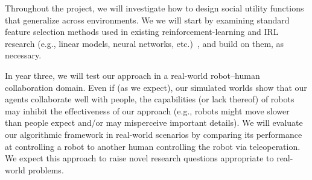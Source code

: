 
\commenta{!!!}
Throughout the project, we will investigate how to design social
utility functions that generalize across environments. We we will
start by examining standard feature selection methods used in existing
reinforcement-learning and IRL research (e.g., linear models, neural
networks,
etc.)~\cite{diuk2009adaptive,kolter2009regularization,li2009reinforcement,parr2008analysis},
and build on them, as necessary.

In year three, we will test our approach in a real-world robot--human
collaboration domain.  Even if (as we expect), our simulated worlds
show that our agents collaborate well with people, the capabilities
(or lack thereof) of robots may inhibit the effectiveness of our
approach (e.g., robots might move slower than people expect and/or may
misperceive important details).  We will evaluate our algorithmic
framework in real-world scenarios by comparing its performance at
controlling a robot to another human controlling the robot via
teleoperation.  We expect this approach to raise novel research
questions appropriate to real-world problems.

%
% 
%
